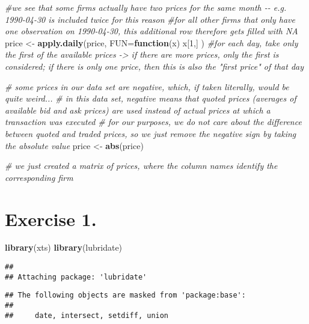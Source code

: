 \documentclass[
]{article}
\newenvironment{Shaded}{\begin{snugshade}}{\end{snugshade}}
\newcommand{\AttributeTok}[1]{\textcolor[rgb]{0.13,0.29,0.53}{#1}}
\newcommand{\CommentTok}[1]{\textcolor[rgb]{0.56,0.35,0.01}{\textit{#1}}}
\newcommand{\ControlFlowTok}[1]{\textcolor[rgb]{0.13,0.29,0.53}{\textbf{#1}}}
\newcommand{\DecValTok}[1]{\textcolor[rgb]{0.00,0.00,0.81}{#1}}
\newcommand{\FunctionTok}[1]{\textcolor[rgb]{0.13,0.29,0.53}{\textbf{#1}}}
\newcommand{\NormalTok}[1]{#1}
\newcommand{\OtherTok}[1]{\textcolor[rgb]{0.56,0.35,0.01}{#1}}
\begin{document}
\begin{Shaded}
\begin{Highlighting}[]
\CommentTok{\#we see that some firms actually have two prices for the same month {-}{-} e.g. 1990{-}04{-}30 is included twice for this reason}
\CommentTok{\#for all other firms that only have one observation on 1990{-}04{-}30, this additional row therefore gets filled with NA}
\NormalTok{price }\OtherTok{\textless{}{-}} \FunctionTok{apply.daily}\NormalTok{(price, }\AttributeTok{FUN=}\ControlFlowTok{function}\NormalTok{(x) x[}\DecValTok{1}\NormalTok{,] ) }\CommentTok{\#for each day, take only the first of the available prices {-}\textgreater{} if there are more prices, only the first is considered; if there is only one price, then this is also the "first price" of that day}

\CommentTok{\# some prices in our data set are negative, which, if taken literally, would be quite weird...}
\CommentTok{\# in this data set, negative means that quoted prices (averages of available bid and ask prices) are used instead of actual prices at which a transaction was executed}
\CommentTok{\# for our purposes, we do not care about the difference between quoted and traded prices, so we just remove the negative sign by taking the absolute value}
\NormalTok{price }\OtherTok{\textless{}{-}} \FunctionTok{abs}\NormalTok{(price)}

\CommentTok{\# we just created a matrix of prices, where the column names identify the corresponding firm}
\end{Highlighting}
\end{Shaded}

\section{Exercise 1.}\label{exercise-1.}

\begin{Shaded}
\begin{Highlighting}[]
\FunctionTok{library}\NormalTok{(xts)}
\FunctionTok{library}\NormalTok{(lubridate)}
\end{Highlighting}
\end{Shaded}

\begin{verbatim}
## 
## Attaching package: 'lubridate'
\end{verbatim}

\begin{verbatim}
## The following objects are masked from 'package:base':
## 
##     date, intersect, setdiff, union
\end{verbatim}
\end{document}
